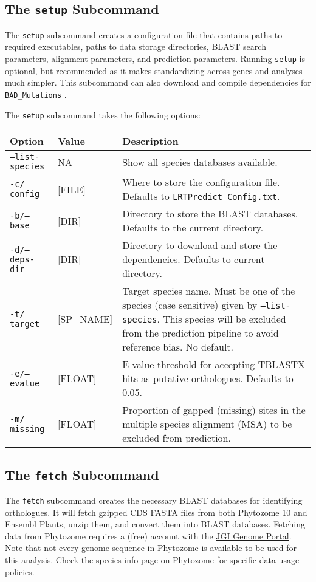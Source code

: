 \documentclass[12pt]{article}
\newcommand{\BM}{\texttt{BAD\_Mutations} }
\begin{document}
\subsection*{The \texttt{setup} Subcommand}
\par The \texttt{setup} subcommand creates a configuration file that contains
paths to required executables, paths to data storage directories, BLAST search
parameters, alignment parameters, and prediction parameters. Running
\texttt{setup} is optional, but recommended as it makes standardizing across
genes and analyses much simpler. This subcommand can also download and compile
dependencies for \BM.

\par The \texttt{setup} subcommand takes the following options:
\begin{table}[H]
    \centering
    \begin{tabular}{p{105pt} l p{260pt}}
    \toprule
    Option & Value & Description \\
    \midrule
    \texttt{--list-species} & NA & Show all species databases available. \\
    \midrule
    \texttt{-c/--config} & [FILE] & Where to store the configuration file. Defaults to \texttt{LRTPredict\_Config.txt}. \\
    \midrule
    \texttt{-b/--base} & [DIR] & Directory to store the BLAST databases. Defaults to the current directory.\\
    \midrule
    \texttt{-d/--deps-dir} & [DIR] & Directory to download and store the dependencies. Defaults to current directory.\\
    \midrule
    \texttt{-t/--target} & [SP\_NAME] & Target species name. Must be one of the species (case sensitive) given by \texttt{--list-species}. This species will be excluded from the prediction pipeline to avoid reference bias. No default.\\
    \midrule
    \texttt{-e/--evalue} & [FLOAT] & E-value threshold for accepting TBLASTX hits as putative orthologues. Defaults to 0.05.\\
    \midrule
    \texttt{-m/--missing} & [FLOAT] & Proportion of gapped (missing) sites in the multiple species alignment (MSA) to be excluded from prediction.\\
    \bottomrule
    \end{tabular}
\end{table}

\subsection*{The \texttt{fetch} Subcommand}
\par The \texttt{fetch} subcommand creates the necessary BLAST databases for
identifying orthologues. It will fetch gzipped CDS FASTA files from both
Phytozome 10 and Ensembl Plants, unzip them, and convert them into BLAST
databases. Fetching data from Phytozome requires a (free) account with
the \href{http://genome.jgi.doe.gov/}{JGI Genome Portal}. Note that not every
genome sequence in Phytozome is available to be used for this analysis. Check
the species info page on Phytozome for specific data usage policies.
\end{document}
